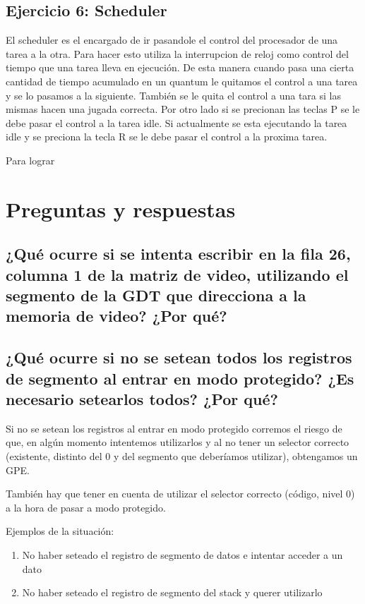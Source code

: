\documentclass[a4paper,10pt,twoside]{article}
\begin{document}
\subsection{Ejercicio 6: Scheduler}

El scheduler es el encargado de ir pasandole el control del procesador de una tarea a la otra. Para hacer esto utiliza la interrupcion de reloj como control del tiempo que una tarea lleva en ejecución. De esta manera cuando pasa una cierta cantidad de tiempo acumulado en un quantum le quitamos el control a una tarea y se lo pasamos a la siguiente. También se le quita el control a una tara si las mismas hacen una jugada correcta.
Por otro lado si se precionan las teclas P se le debe pasar el control a la tarea idle. Si actualmente se esta ejecutando la tarea idle y se preciona la tecla R se le debe pasar el control a la proxima tarea.

Para lograr 



\section{Preguntas y respuestas}
\subsection{¿Qué ocurre si se intenta escribir en la fila 26, columna 1 de la matriz de video, utilizando el segmento de la GDT que direcciona a la memoria de video? ¿Por qué?}

\subsection{¿Qué ocurre si no se setean todos los registros de segmento al entrar en
modo protegido? ¿Es necesario setearlos todos? ¿Por qué?}
Si no se setean los registros al entrar en modo protegido corremos el riesgo de que, en algún momento intentemos utilizarlos y al no tener un selector correcto (existente, distinto del 0 y del segmento que deberíamos utilizar), obtengamos un GPE.

También hay que tener en cuenta de utilizar el selector correcto (código, nivel 0) a la hora de pasar a modo protegido.

Ejemplos de la situación:
\begin{enumerate}
	\item No haber seteado el registro de segmento de datos e intentar acceder a un dato
	\item No haber seteado el registro de segmento del stack y querer utilizarlo
\end{enumerate}
\end{document}
